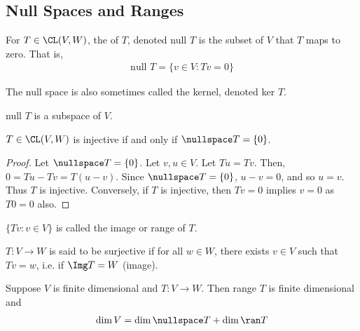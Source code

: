 \documentclass{article}
\begin{document}
\subsection{Null Spaces and Ranges}
  \begin{defn}
    For $T \in \CL(V, W)$, the  of $T$, denoted null $ T$ is the subset of $V$ that $T$ maps to zero. That is,
    \begin{align*}
      \text{null }T = \{v \in V: Tv = 0\}
    \end{align*}
  \end{defn}
  The null space is also sometimes called the kernel, denoted ker $ T$.
  \begin{prop}
    null $ T$ is a subspace of $V$.
  \end{prop}
  \begin{prop}
    $T \in \CL(V, W)$ is injective if and only if $\nullspace T = \{0\}$.
  \end{prop}
  \begin{proof}
    Let $\nullspace T = \{0\}$. Let $v, u \in V$. Let $Tu = Tv$. Then, $0 = Tu - Tv = T(u - v)$. Since $\nullspace T = \{0\}$, $u - v = 0$, and so $u = v$. Thus $T$ is injective. Conversely, if
    $T$ is injective, then $Tv = 0$ implies $v = 0$ as $T0 = 0$ also.
  \end{proof}
  \begin{defn}
    $\{Tv: v \in V\}$ is called the image or range of $T$.
  \end{defn}
  \begin{defn}
    $T: V \to W$ is said to be surjective if for all $w \in W$, there exists $v \in V$ such that $Tv = w$, i.e. if $\Img T = W$ (image).
  \end{defn}
  \begin{prop}\label{prop:fund_thm_lin_maps}
    Suppose $V$ is finite dimensional and $T: V \to W$. Then range $ T$ is finite dimensional and 
    \begin{align*}
      \dim V = \dim\nullspace T + \dim\ran T
    \end{align*}
  \end{prop}
\end{document}

